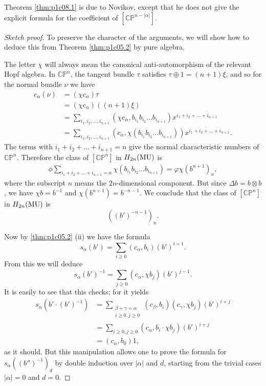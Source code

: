 \documentclass[../main]{subfiles}
\begin{document}
Theorem \ref{thm:p1c08.1} is due to Novikov, except that he does not give the explicit formula for the coefficient of $[\mathbb{CP}^{n-|\alpha|}]$.
\begin{proof}[Sketch proof]
To preserve the character of the arguments, we will show how to deduce this from Theorem \ref{thm:p1c05.2} by pure algebra.

The letter $\chi$ will always mean the canonical anti-automorphism of the relevant Hopf algebra. In $\mathbb{CP}^n$, the tangent bundle $\tau$ satisfies $\tau \oplus 1 = (n+1)\xi$, and so for the normal bundle $\nu$ we have
\begin{align*}
    c_\alpha (\nu) &= (\chi c_\alpha)\tau \\
    &= (\chi c_\alpha)((n+1)\xi) \\
    &= \sum_{i_1,i_2,\dots,i_{n+1}} (\chi c_\alpha , b_{i_1} b_{i_2} \dots b_{i_{n+1}})x^{i_1 + i_2 + \dots + i_{n+1}} \\
    &= \sum_{i_1,i_2,\dots,i_{n+1}} (c_\alpha , \chi(b_{i_1} b_{i_2} \dots b_{i_{n+1}}))x^{i_1 + i_2 + \dots + i_{n+1}}.
\end{align*}
The terms with $i_1 + i_2 + \dots + i_{n+1} = n$ give the normal characteristic numbers of $\mathbb{CP}^n$. Therefore the class of $[\mathbb{CP}^n]$ in $H_{2n}(\mathrm{MU})$ is 
\begin{align*}
    \phi \sum_{i_1 + i_2 + \dots + i_{n+1} = n}  \chi(b_{i_1} b_{i_2} \dots b_{i_{n+1}}) = \varphi \chi(b^{n+1})_n,
\end{align*}
where the subscript $n$ means the $2n$-dimensional component. But since $\Delta b = b \otimes b$, we have $\chi b = b^{-1}$ and $\chi(b^{n+1}) = b^{-n-1}$. We conclude that the class of $[\mathbb{CP}^n]$ in $H_{2n}(\mathrm{MU})$ is 
\[((b')^{-n-1})_n.\]

Now by \ref{thm:p1c05.2} (ii) we have the formula
\[s_\alpha(b') = \sum_{i \geq 0}(c_\alpha,b_i)(b')^{i+1}.\]
From this we will deduce
\begin{equation}
    \label{eqn:p1c08.2} s_\alpha (b')^{-1} = \sum_{j \geq 0} (c_\alpha, \chi b_j)(b')^{j-1}.
\end{equation}
It is easily to see that this checks; for it yields
\begin{align*}
    s_\alpha(b' \cdot (b')^{-1}) &= \sum_{\substack{\beta + \gamma = \alpha \\ i \geq 0, j \geq 0}} (c_\beta,b_i)(c_\gamma,\chi b_j)(b')^{i+j} \\
    &= \sum_{i \geq 0, j \geq 0} (c_\alpha, b_i \cdot \chi b_j)(b')^{i+j} \\
    &= (c_\alpha, b_0)1,
\end{align*}
as it should. But this manipulation allows one to prove the formula for $s_\alpha((b'')^{-1})_d$ by double induction over $|\alpha|$ and $d$, starting from the trivial cases $|\alpha| = 0$ and $d = 0$.


\end{proof}
\end{document}
